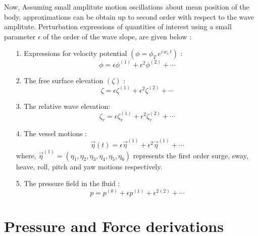Now, Assuming small amplitute motion oscillations about mean position of the body, approximations can be obtain 
up to second order with respect to the wave amplitute. Perturbation expressions of quantities 
of interest using a small parameter $\epsilon$ of the order of the wave slope, are given below :

\begin{itemize}
    \item [1.] Expressions for velocity potential $\left(\phi = \phi_T\,e^{i\,w_e\,t}\right)$ :
    \begin{equation}
        \phi = \epsilon \phi^{(1)} + \epsilon^2 \phi^{(2)} + \cdots
    \end{equation}

    \item [2.] The free surface elevation $(\zeta)$ :
    \begin{equation}
        \zeta = \epsilon \zeta^{(1)} + \epsilon^2 \zeta^{(2)} + \cdots
    \end{equation}

    \item [3.] The relative wave elevation:
    \begin{equation}
        \zeta_r = \epsilon \zeta_r^{(1)} + \epsilon^2 \zeta_r^{(2)} + \cdots
    \end{equation}

    \item [4.] The vessel motions :
    \begin{equation}
        \vec{\eta}(t) = \epsilon \vec{\eta}^{(1)} + \epsilon^2 \vec{\eta}^{(1)} + \cdots
    \end{equation}
    where, $\vec{\eta}^{(1)} = (\eta_1, \eta_2, \eta_3, \eta_4, \eta_5, \eta_6)$ represents the first order surge, 
    sway, heave, roll, pitch and yaw motions respectively.

    \item [5.] The pressure field in the fluid :
    \begin{equation}
        \label{eq:per_perssure}
        p = p^{(0)} + \epsilon p^{(1)} + \epsilon^{2} {^{(2)}} + \cdots
    \end{equation}
\end{itemize}



\section{Pressure and Force derivations}



